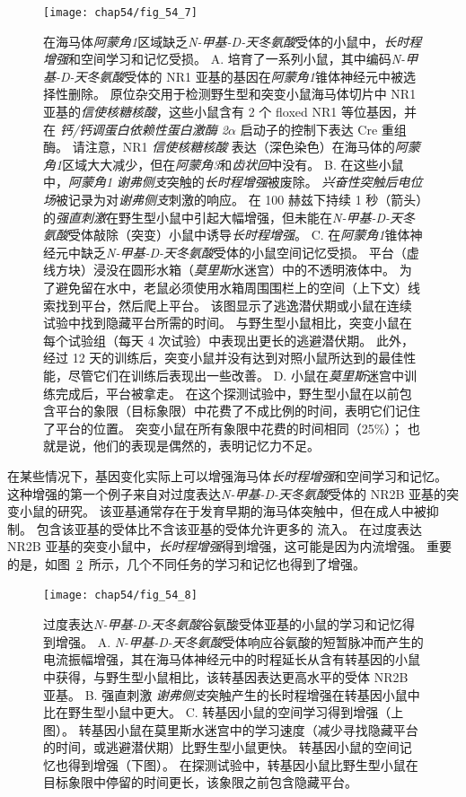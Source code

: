 \begin{figure}[htbp]
	\centering
	\texttt{[image: chap54/fig\_54\_7]}
	\caption{在海马体\textit{阿蒙角1}区域缺乏\textit{N-甲基-D-天冬氨酸}受体的小鼠中，\textit{长时程增强}和空间学习和记忆受损。
		A. 培育了一系列小鼠，其中编码\textit{N-甲基-D-天冬氨酸}受体的 NR1 亚基的基因在\textit{阿蒙角1}锥体神经元中被选择性删除。
		原位杂交用于检测野生型和突变小鼠海马体切片中 NR1 亚基的\textit{信使核糖核酸}，这些小鼠含有 2 个 floxed NR1 等位基因，并在 \textit{钙/钙调蛋白依赖性蛋白激酶 2}$\alpha$ 启动子的控制下表达 Cre 重组酶。
		请注意，NR1 \textit{信使核糖核酸} 表达（深色染色）在海马体的\textit{阿蒙角1}区域大大减少，但在\textit{阿蒙角3}和\textit{齿状回}中没有。
		B. 在这些小鼠中，\textit{阿蒙角1} \textit{谢弗侧支}突触的\textit{长时程增强}被废除。
		\textit{兴奋性突触后电位场}被记录为对\textit{谢弗侧支}刺激的响应。
		在 100 赫兹下持续 1 秒（箭头）的\textit{强直刺激}在野生型小鼠中引起大幅增强，但未能在\textit{N-甲基-D-天冬氨酸}受体敲除（突变）小鼠中诱导\textit{长时程增强}。
		C. 在\textit{阿蒙角1}锥体神经元中缺乏\textit{N-甲基-D-天冬氨酸}受体的小鼠空间记忆受损。
		平台（虚线方块）浸没在圆形水箱（\textit{莫里斯}水迷宫）中的不透明液体中。
		为了避免留在水中，老鼠必须使用水箱周围围栏上的空间（上下文）线索找到平台，然后爬上平台。
		该图显示了逃逸潜伏期或小鼠在连续试验中找到隐藏平台所需的时间。
		与野生型小鼠相比，突变小鼠在每个试验组（每天 4 次试验）中表现出更长的逃避潜伏期。
		此外，经过 12 天的训练后，突变小鼠并没有达到对照小鼠所达到的最佳性能，尽管它们在训练后表现出一些改善。
		D. 小鼠在\textit{莫里斯}迷宫中训练完成后，平台被拿走。
		在这个探测试验中，野生型小鼠在以前包含平台的象限（目标象限）中花费了不成比例的时间，表明它们记住了平台的位置。
		突变小鼠在所有象限中花费的时间相同（25\%）；
		也就是说，他们的表现是偶然的，表明记忆力不足。}
	\label{fig:54_7}
\end{figure}


在某些情况下，基因变化实际上可以增强海马体\textit{长时程增强}和空间学习和记忆。
这种增强的第一个例子来自对过度表达\textit{N-甲基-D-天冬氨酸}受体的 NR2B 亚基的突变小鼠的研究。
该亚基通常存在于发育早期的海马体突触中，但在成人中被抑制。
包含该亚基的受体比不含该亚基的受体允许更多的  流入。
在过度表达 NR2B 亚基的突变小鼠中，\textit{长时程增强}得到增强，这可能是因为内流增强。
重要的是，如图~\ref{fig:54_8}~所示，几个不同任务的学习和记忆也得到了增强。


\begin{figure}[htbp]
	\centering
	\texttt{[image: chap54/fig\_54\_8]}
	\caption{过度表达\textit{N-甲基-D-天冬氨酸}谷氨酸受体亚基的小鼠的学习和记忆得到增强。
		A. \textit{N-甲基-D-天冬氨酸}受体响应谷氨酸的短暂脉冲而产生的电流振幅增强，其在海马体神经元中的时程延长从含有转基因的小鼠中获得，与野生型小鼠相比，该转基因表达更高水平的受体 NR2B 亚基。
		B. 强直刺激 \textit{谢弗侧支}突触产生的长时程增强在转基因小鼠中比在野生型小鼠中更大。
		C. 转基因小鼠的空间学习得到增强（上图）。
		转基因小鼠在莫里斯水迷宫中的学习速度（减少寻找隐藏平台的时间，或逃避潜伏期）比野生型小鼠更快。
		转基因小鼠的空间记忆也得到增强（下图）。
		在探测试验中，转基因小鼠比野生型小鼠在目标象限中停留的时间更长，该象限之前包含隐藏平台。}
	\label{fig:54_8}
\end{figure}


